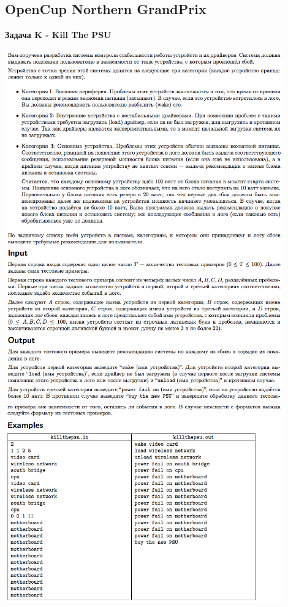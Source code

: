 \documentclass[a4paper,12pt]{article}
\begin{document}
%
%
\newpage
\subsection{OpenCup Northern GrandPrix}

\textbf{{\large Задача K - Kill The PSU}} \\
\begin{center}
\includegraphics[width=0.9\textwidth]{OC_Northern/OC_Northern_K1.png}\\ [1cm]
\includegraphics[width=0.9\textwidth]{OC_Northern/OC_Northern_K2.png}\\ [1cm]
\end{center}
\newpage
\end{document}
